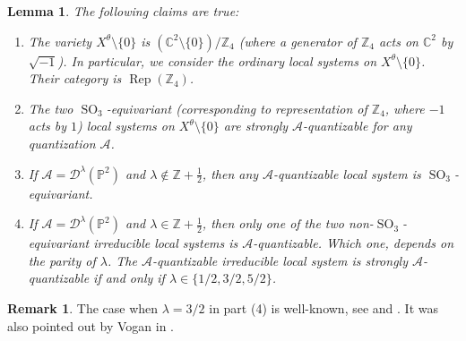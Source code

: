 \documentclass[12pt]{amsart}
\newcommand{\C}{\mathbb{C}}
\newcommand{\A}{\mathcal{A}}
\newcommand{\Z}{\mathbb{Z}}
\newtheorem{Lem}[Thm]{Lemma}
\theoremstyle{definition}
\newtheorem{Rem}[Thm]{Remark}
\numberwithin{equation}{section}
\begin{document}
\begin{Lem}\label{Lem:sl3_so3_obstructive}
The following claims are true:
\begin{enumerate}
\item The variety $X^\theta\setminus \{0\}$ is $(\C^2\setminus \{0\})/\Z_4$ (where a generator of $\Z_4$ acts on $\C^2$ by $\sqrt{-1}$). In particular, we consider the ordinary local systems on
    $X^\theta\setminus \{0\}$. Their category is $\operatorname{Rep}(\Z_4)$.
\item The two $\operatorname{SO}_3$-equivariant (corresponding to representation of $\Z_4$, where
$-1$ acts by $1$) local systems on $X^\theta\setminus \{0\}$
are strongly $\A$-quantizable for any quantization $\A$.
\item If $\A=\mathscr{D}^\lambda(\mathbb{P}^2)$  and $\lambda\not\in \Z+\frac{1}{2}$, then any $\A$-quantizable
local system is $\operatorname{SO}_3$-equivariant.
\item If $\A=\mathscr{D}^\lambda(\mathbb{P}^2)$  and $\lambda\in \Z+\frac{1}{2}$, then only one of the two non-$\operatorname{SO}_3$-equivariant
irreducible local systems is $\A$-quantizable. Which one, depends on the parity of $\lambda$. The $\A$-quantizable irreducible local system is strongly $\A$-quantizable if and only if
$\lambda\in \{1/2,3/2,5/2\}$.
\end{enumerate}
\end{Lem}
\begin{Rem}
	The case when $\lambda=3/2$ in part (4) is well-known, see \cite{RawnsleySternberg} and \cite{Torasso}. It was also pointed out by Vogan in \cite[Example 12.4]{Vogan}. 
\end{Rem}
\end{document}
